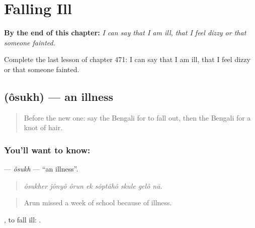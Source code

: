 
\chapter{Falling Ill}
\label{ch:bn-falling-ill}

\begin{chapteropening}
\textbf{By the end of this chapter:} \emph{I can say that I am ill, that I feel dizzy or that someone fainted.}

Complete the last lesson of chapter 471: I can say that I am ill, that I feel dizzy or that someone fainted.
\end{chapteropening}

\section[\texorpdfstring{\bn{অসুখ} (ôsukh)}{অসুখ (ôsukh)}]{ (ôsukh) — an illness}

\label{lesson:BN-C471-osukh}



\begin{quote}
Before the new one: say the Bengali for to fall out, then the Bengali for a knot of hair.
\end{quote}

\subsection*{You'll want to know: }
\textbf{} — \emph{ôsukh} — \textquotedblleft{}an illness\textquotedblright{}.

\begin{quote}
       
\end{quote}

\begin{quote}
\emph{ôsukher jônyô ôrun ek sôptāhô skule gelô nā.}
\end{quote}

\begin{quote}
Arun missed a week of school because of illness.
\end{quote}

 , to fall ill:   .

